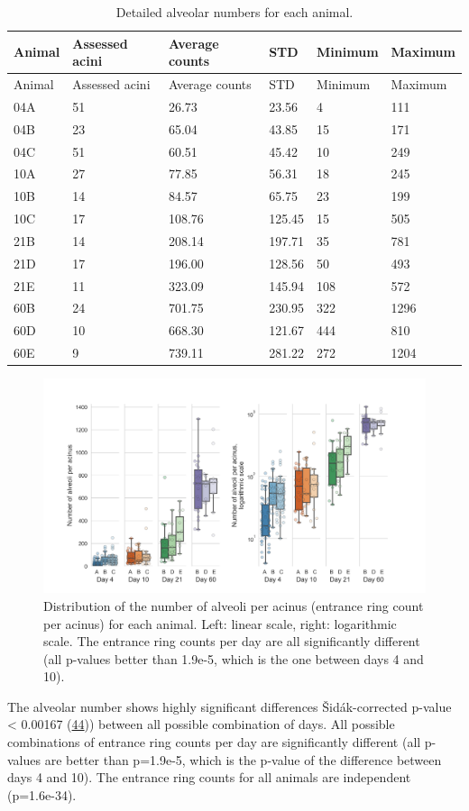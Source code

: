 \documentclass[
  american,
]{article}
\begin{document}
\begin{longtable}[]{@{}llllll@{}}
\caption{Detailed alveolar numbers for each animal. \label{tbl:counts}}\tabularnewline
\toprule
Animal & Assessed acini & Average counts & STD & Minimum & Maximum\tabularnewline
\midrule
\endfirsthead
\toprule
Animal & Assessed acini & Average counts & STD & Minimum & Maximum\tabularnewline
\midrule
\endhead
04A & 51 & 26.73 & 23.56 & 4 & 111\tabularnewline
04B & 23 & 65.04 & 43.85 & 15 & 171\tabularnewline
04C & 51 & 60.51 & 45.42 & 10 & 249\tabularnewline
10A & 27 & 77.85 & 56.31 & 18 & 245\tabularnewline
10B & 14 & 84.57 & 65.75 & 23 & 199\tabularnewline
10C & 17 & 108.76 & 125.45 & 15 & 505\tabularnewline
21B & 14 & 208.14 & 197.71 & 35 & 781\tabularnewline
21D & 17 & 196.00 & 128.56 & 50 & 493\tabularnewline
21E & 11 & 323.09 & 145.94 & 108 & 572\tabularnewline
60B & 24 & 701.75 & 230.95 & 322 & 1296\tabularnewline
60D & 10 & 668.30 & 121.67 & 444 & 810\tabularnewline
60E & 9 & 739.11 & 281.22 & 272 & 1204\tabularnewline
\bottomrule
\end{longtable}

\begin{figure}
\hypertarget{fig:02}{%
\centering
\includegraphics{images/fig02.png}
\caption{Distribution of the number of alveoli per acinus (entrance ring count per acinus) for each animal.
Left: linear scale, right: logarithmic scale.
The entrance ring counts per day are all significantly different (all p-values better than 1.9e-5, which is the one between days 4 and 10).}\label{fig:02}
}
\end{figure}

The alveolar number shows highly significant differences Šidák-corrected p-value \textless{} 0.00167 (\protect\hyperlink{ref-GtCynqsI}{44})) between all possible combination of days.
All possible combinations of entrance ring counts per day are significantly different (all p-values are better than p=1.9e-5, which is the p-value of the difference between days 4 and 10).
The entrance ring counts for all animals are independent (p=1.6e-34).
\end{document}
